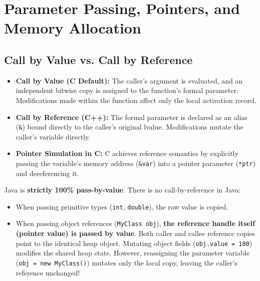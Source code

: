 \section{Parameter Passing, Pointers, and Memory Allocation}
\label{sec:parameter_passing_pointers}

\subsection{Call by Value vs. Call by Reference}
\begin{itemize}[leftmargin=*]
    \item \textbf{Call by Value (C Default):} The caller's argument is evaluated, and an independent bitwise copy is assigned to the function's formal parameter. Modifications made within the function affect only the local activation record.
    \item \textbf{Call by Reference (C++):} The formal parameter is declared as an alias (\texttt{\&}) bound directly to the caller's original lvalue. Modifications mutate the caller's variable directly.
    \item \textbf{Pointer Simulation in C:} C achieves reference semantics by explicitly passing the variable's memory address (\texttt{\&var}) into a pointer parameter (\texttt{*ptr}) and dereferencing it.
\end{itemize}

\begin{keyconcept}
Java is \textbf{strictly 100\% pass-by-value}. There is no call-by-reference in Java:
\begin{itemize}[leftmargin=*]
    \item When passing primitive types (\texttt{int}, \texttt{double}), the raw value is copied.
    \item When passing object references (\texttt{MyClass obj}), \textbf{the reference handle itself (pointer value) is passed by value}. Both caller and callee reference copies point to the identical heap object. Mutating object fields (\texttt{obj.value = 100}) modifies the shared heap state. However, reassigning the parameter variable (\texttt{obj = new MyClass()}) mutates only the local copy, leaving the caller's reference unchanged!
\end{itemize}
\end{keyconcept}

